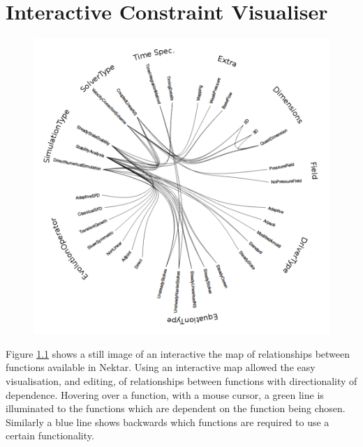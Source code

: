 \documentclass[11pt, a4paper]{report}
\begin{document}
\newpage
%

\newpage
\appendix

\chapter{Interactive Constraint Visualiser}
\label{app:constraints}

\begin{figure}[htb!]
 \centering
 \includegraphics[width=.9\linewidth,  clip=true, trim = 0cm 0cm 0cm 0cm]{constraint_mapping}
 \label{fig:constraint_mapping}
\end{figure}

Figure \ref{fig:constraint_mapping} shows a still image of an interactive the map of relationships between functions available in Nektar. Using an interactive map allowed the easy visualisation, and editing, of relationships between functions with directionality of dependence. Hovering over a function, with a mouse cursor, a green line is illuminated to the functions which are dependent on the function being chosen. Similarly a blue line shows backwards which functions are required to use a certain functionality.
\end{document}
